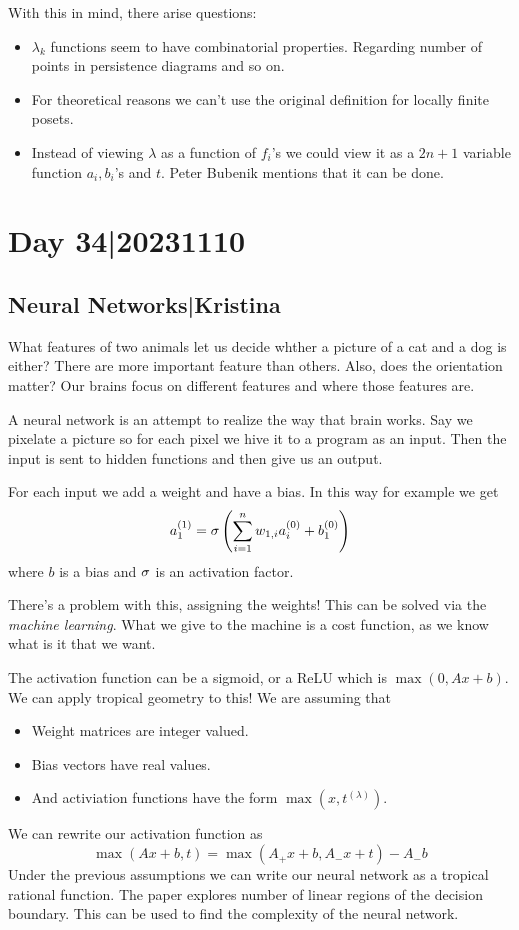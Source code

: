 \documentclass[12pt]{memoir}
\theoremstyle{definition}
\def\l{\lambda}
\def\la{\lambda}
\begin{document}
With this in mind, there arise questions:
\begin{itemize}
    \item $\la_k$ functions seem to have combinatorial properties. Regarding number of points in persistence diagrams and so on.
    \item For theoretical reasons we can't use the original definition for locally finite posets.
    \item Instead of viewing $\la$ as a function of $f_i$'s we could view it as a $2n+1$ variable function $a_i,b_i$'s and $t$. Peter Bubenik mentions that it can be done. 
\end{itemize}

\section{Day 34|20231110}
\subsection{Neural Networks|Kristina}

\begin{Ex}
    What features of two animals let us decide whther a picture of a cat and a dog is either? There are more important feature than others. Also, does the orientation matter? Our brains focus on different features and where those features are.
\end{Ex}

A neural network is an attempt to realize the way that brain works. Say we pixelate a picture so for each pixel we hive it to a program as an input. Then the input is sent to hidden functions and then give us an output.\par 
For each input we add a weight and have a bias. In this way for example we get 
$$a_1^{(1)}=\sigma\left(\sum_{i=1}^n w_{1,i}a_i^{(0)}+b_1^{(0)}\right)$$
where $b$ is a bias and $\sigma$ is an activation factor.\par 
There's a problem with this, assigning the weights! This can be solved via the \emph{machine learning}. What we give to the machine is a cost function, as we know what is it that we want.\par 
The activation function can be a sigmoid, or a ReLU which is $\max(0,Ax+b)$. We can apply tropical geometry to this! We are assuming that 
\begin{itemize}
    \item Weight matrices are integer valued.
    \item Bias vectors have real values.
    \item And activiation functions have the form $\max(x,t^{(\l)})$.
\end{itemize}
We can rewrite our activation function as 
$$\max(Ax+b,t)=\max(A_+x+b,A_-x+t)-A_-b$$
Under the previous assumptions we can write our neural network as a tropical rational function. The paper explores number of linear regions of the decision boundary. This can be used to find the complexity of the neural network.
\end{document}

